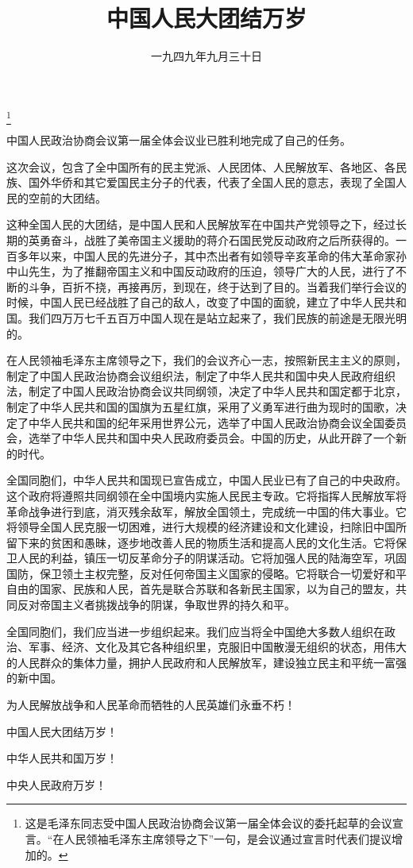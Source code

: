 
\title{中国人民大团结万岁}
\date{一九四九年九月三十日}
\thanks{这是毛泽东同志受中国人民政治协商会议第一届全体会议的委托起草的会议宣言。“在人民领袖毛泽东主席领导之下”一句，是会议通过宣言时代表们提议增加的。}
\maketitle



中国人民政治协商会议第一届全体会议业已胜利地完成了自己的任务。

这次会议，包含了全中国所有的民主党派、人民团体、人民解放军、各地区、各民族、国外华侨和其它爱国民主分子的代表，代表了全国人民的意志，表现了全国人民的空前的大团结。

这种全国人民的大团结，是中国人民和人民解放军在中国共产党领导之下，经过长期的英勇奋斗，战胜了美帝国主义援助的蒋介石国民党反动政府之后所获得的。一百多年以来，中国人民的先进分子，其中杰出者有如领导辛亥革命的伟大革命家孙中山先生，为了推翻帝国主义和中国反动政府的压迫，领导广大的人民，进行了不断的斗争，百折不挠，再接再厉，到现在，终于达到了目的。当着我们举行会议的时候，中国人民已经战胜了自己的敌人，改变了中国的面貌，建立了中华人民共和国。我们四万万七千五百万中国人现在是站立起来了，我们民族的前途是无限光明的。

在人民领袖毛泽东主席领导之下，我们的会议齐心一志，按照新民主主义的原则，制定了中国人民政治协商会议组织法，制定了中华人民共和国中央人民政府组织法，制定了中国人民政治协商会议共同纲领，决定了中华人民共和国定都于北京，制定了中华人民共和国的国旗为五星红旗，采用了义勇军进行曲为现时的国歌，决定了中华人民共和国的纪年采用世界公元，选举了中国人民政治协商会议全国委员会，选举了中华人民共和国中央人民政府委员会。中国的历史，从此开辟了一个新的时代。

全国同胞们，中华人民共和国现已宣告成立，中国人民业已有了自己的中央政府。这个政府将遵照共同纲领在全中国境内实施人民民主专政。它将指挥人民解放军将革命战争进行到底，消灭残余敌军，解放全国领土，完成统一中国的伟大事业。它将领导全国人民克服一切困难，进行大规模的经济建设和文化建设，扫除旧中国所留下来的贫困和愚昧，逐步地改善人民的物质生活和提高人民的文化生活。它将保卫人民的利益，镇压一切反革命分子的阴谋活动。它将加强人民的陆海空军，巩固国防，保卫领土主权完整，反对任何帝国主义国家的侵略。它将联合一切爱好和平自由的国家、民族和人民，首先是联合苏联和各新民主国家，以为自己的盟友，共同反对帝国主义者挑拨战争的阴谋，争取世界的持久和平。

全国同胞们，我们应当进一步组织起来。我们应当将全中国绝大多数人组织在政治、军事、经济、文化及其它各种组织里，克服旧中国散漫无组织的状态，用伟大的人民群众的集体力量，拥护人民政府和人民解放军，建设独立民主和平统一富强的新中国。

为人民解放战争和人民革命而牺牲的人民英雄们永垂不朽！

中国人民大团结万岁！

中华人民共和国万岁！

中央人民政府万岁！
